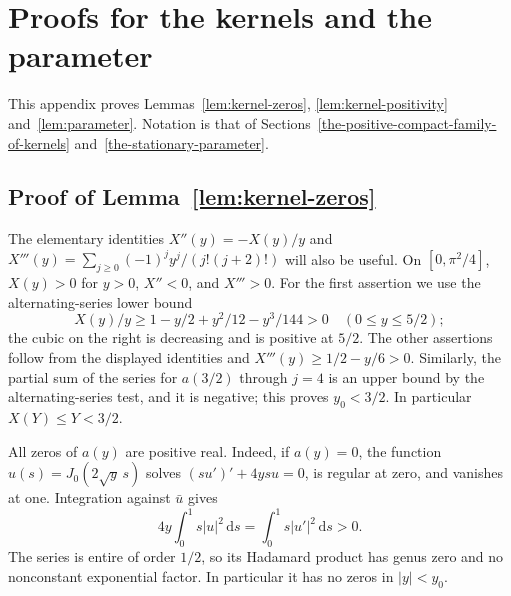 \section{Proofs for the kernels and the parameter}\label{app:kernels}

This appendix proves Lemmas~\ref{lem:kernel-zeros}, \ref{lem:kernel-positivity}
and~\ref{lem:parameter}. Notation is that of
Sections~\ref{the-positive-compact-family-of-kernels}
and~\ref{the-stationary-parameter}.

\subsection{Proof of Lemma~\ref{lem:kernel-zeros}}\label{app:kernel-zeros}

The elementary identities \(X''(y)=-X(y)/y\) and
\(X'''(y)=\sum_{j\ge0}(-1)^jy^j/(j!(j+2)!)\) will also be useful. On
\([0,\pi^2/4]\), \(X(y)>0\) for \(y>0\), \(X''<0\), and \(X'''>0\). For
the first assertion we use the alternating-series
lower bound \[
 X(y)/y\ge1-y/2+y^2/12-y^3/144>0\quad(0\le y\le5/2);
\] the cubic on the right is decreasing and is positive at \(5/2\). The
other assertions follow from the displayed identities and
\(X'''(y)\ge1/2-y/6>0\). Similarly, the partial sum of the series for
\(a(3/2)\) through \(j=4\) is an upper bound by the alternating-series
test, and it is negative; this proves \(y_0<3/2\). In particular
\(X(Y)\le Y<3/2\).

All zeros of \(a(y)\) are positive real. Indeed, if \(a(y)=0\), the
function \(u(s)=J_0(2\sqrt y\,s)\) solves \((su')'+4ysu=0\), is regular
at zero, and vanishes at one. Integration against \(\bar u\) gives \[
 4y\int_0^1s|u|^2\,\mathrm{d}s=\int_0^1s|u'|^2\,\mathrm{d}s>0.
\] The series is entire of order \(1/2\), so its Hadamard product has
genus zero and no nonconstant exponential factor. In particular it has
no zeros in \(|y|<y_0\).

